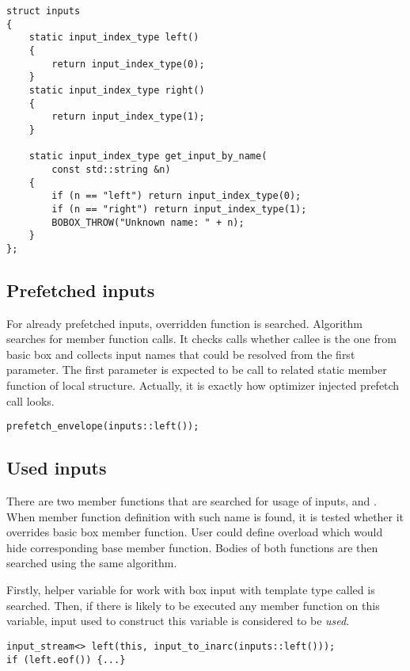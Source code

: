 \begin{lstlisting}[caption={Partially preprocessed input macro with (left, 0, right, 1)
 arguments.}]
struct inputs
{
    static input_index_type left()
    {
        return input_index_type(0);
    }
    static input_index_type right()
    {
        return input_index_type(1);
    }

    static input_index_type get_input_by_name(
        const std::string &n)
    {
        if (n == "left") return input_index_type(0);
        if (n == "right") return input_index_type(1);
        BOBOX_THROW("Unknown name: " + n);
    }
};
\end{lstlisting}

\subsection{Prefetched inputs}
For already prefetched inputs,  overridden function is searched. Algorithm searches for  member function calls. It checks calls whether callee is the one from basic box and collects input names that could be resolved from the first parameter. The first parameter is expected to be call to related static member function of local  structure. Actually, it is exactly how optimizer injected prefetch call looks.

\begin{lstlisting}[caption={Injected prefetch call for input called \emph{left}.}]
prefetch_envelope(inputs::left());
\end{lstlisting}

\subsection{Used inputs}
There are two member functions that are searched for usage of inputs,  and . When member function definition with such name is found, it is tested whether it overrides basic box member function. User could define overload which would hide corresponding base member function. Bodies of both functions are then searched using the same algorithm.

Firstly, helper variable for work with box input with template type called 
 is searched. Then, if there is likely to be executed any member function on this variable, input used to construct this variable is considered to be \emph{used}.

\begin{lstlisting}[caption={Example of \emph{used} input.}]
input_stream<> left(this, input_to_inarc(inputs::left()));
if (left.eof()) {...}
\end{lstlisting}